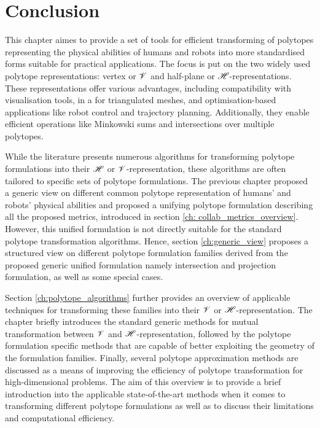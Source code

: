 \section{Conclusion}

This chapter aimes to provide a set of tools for efficient transforming of polytopes representing the physical abilities of humans and robots into more standardised forms suitable for practical applications. The focus is put on the two widely used polytope representations: vertex or $\mathscr{V}$ and half-plane or $\mathscr{H}$-representations. These representations offer various advantages, including compatibility with visualisation tools, in a for triangulated meshes, and optimisation-based applications like robot control and trajectory planning. Additionally, they enable efficient operations like Minkowski sums and intersections over multiple polytopes.

While the literature presents numerous algorithms for transforming polytope formulations into their $\mathscr{H}$ or $\mathscr{V}$-representation, these algorithms are often tailored to specific sets of polytope formulations. The previous chapter proposed a generic view on different common polytope representation of humans' and robots' physical abilities and proposed a unifying polytope formulation describing all the proposed metrics, introduced in section \ref{ch: collab_metrics_overview}. However, this unified formulation is not directly suitable for the standard polytope transformation algorithms. Hence, section \ref{ch:generic_view} proposes a structured view on different polytope formulation families derived from the proposed generic unified formulation namely intersection and projection formulation, as well as some special cases.

Section \ref{ch:polytope_algorithms} further provides an overview of applicable techniques for transforming these families into their $\mathscr{V}$ or $\mathscr{H}$-representation. The chapter briefly introduces the standard generic methods for mutual transformation between $\mathscr{V}$ and $\mathscr{H}$-representation, followed by the polytope formulation specific methods that are capable of better exploiting the geometry of the formulation families. Finally, several polytope approximation methods are discussed as a means of improving the efficiency of polytope transformation for high-dimensional problems. 
The aim of this overview is to provide a brief introduction into the applicable state-of-the-art methods when it comes to transforming different polytope formulations as well as to discuss their limitations and computational efficiency.

